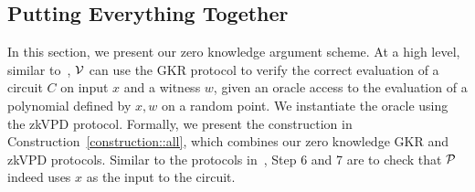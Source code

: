 \subsection{Putting Everything Together}\label{subsec::zkall}

In this section, we present our zero knowledge argument scheme. At a high level, similar to~\cite{zhang2017vsql,hyrax,zkvpd}, $\V$ can use the GKR protocol to verify the correct evaluation of a circuit $C$ on input $x$ and a witness $w$, given an oracle access to the evaluation of a polynomial defined by $x,w$ on a random point. We instantiate the oracle using the zkVPD protocol. Formally, we present the construction in Construction~\ref{construction::all}, which combines our zero knowledge GKR and zkVPD protocols. Similar to the protocols in~\cite{zkvpd,hyrax}, Step 6 and 7 are to check that $\P$ indeed uses $x$ as the input to the circuit.
